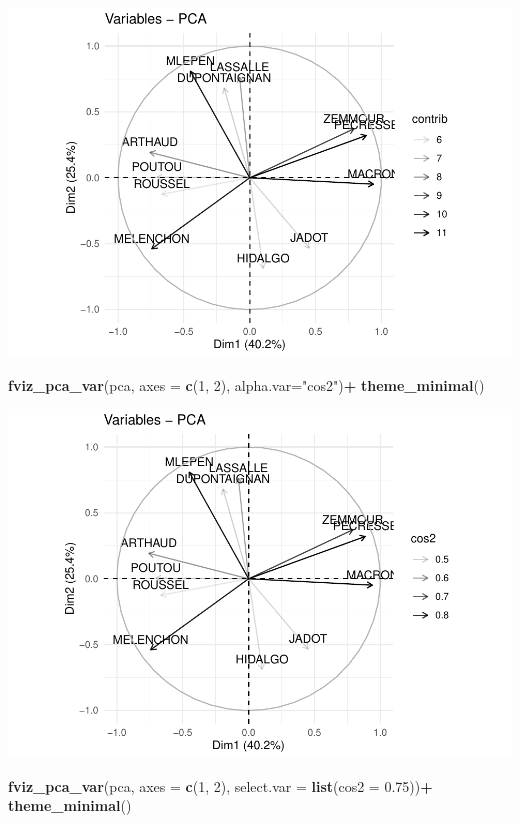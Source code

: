 \documentclass[
]{book}
\newenvironment{Shaded}{\begin{snugshade}}{\end{snugshade}}
\newcommand{\AttributeTok}[1]{\textcolor[rgb]{0.13,0.29,0.53}{#1}}
\newcommand{\DecValTok}[1]{\textcolor[rgb]{0.00,0.00,0.81}{#1}}
\newcommand{\FloatTok}[1]{\textcolor[rgb]{0.00,0.00,0.81}{#1}}
\newcommand{\FunctionTok}[1]{\textcolor[rgb]{0.13,0.29,0.53}{\textbf{#1}}}
\newcommand{\NormalTok}[1]{#1}
\newcommand{\SpecialCharTok}[1]{\textcolor[rgb]{0.81,0.36,0.00}{\textbf{#1}}}
\newcommand{\StringTok}[1]{\textcolor[rgb]{0.31,0.60,0.02}{#1}}
\begin{document}
\includegraphics{manuel_geo_quanti_files/figure-latex/unnamed-chunk-66-1.pdf}

\begin{Shaded}
\begin{Highlighting}[]
\FunctionTok{fviz\_pca\_var}\NormalTok{(pca,  }\AttributeTok{axes =} \FunctionTok{c}\NormalTok{(}\DecValTok{1}\NormalTok{, }\DecValTok{2}\NormalTok{), }\AttributeTok{alpha.var=}\StringTok{"cos2"}\NormalTok{)}\SpecialCharTok{+} \FunctionTok{theme\_minimal}\NormalTok{()}
\end{Highlighting}
\end{Shaded}

\includegraphics{manuel_geo_quanti_files/figure-latex/unnamed-chunk-66-2.pdf}

\begin{Shaded}
\begin{Highlighting}[]
\FunctionTok{fviz\_pca\_var}\NormalTok{(pca,  }\AttributeTok{axes =} \FunctionTok{c}\NormalTok{(}\DecValTok{1}\NormalTok{, }\DecValTok{2}\NormalTok{), }\AttributeTok{select.var =} \FunctionTok{list}\NormalTok{(}\AttributeTok{cos2 =} \FloatTok{0.75}\NormalTok{))}\SpecialCharTok{+} \FunctionTok{theme\_minimal}\NormalTok{()}
\end{Highlighting}
\end{Shaded}
\end{document}
